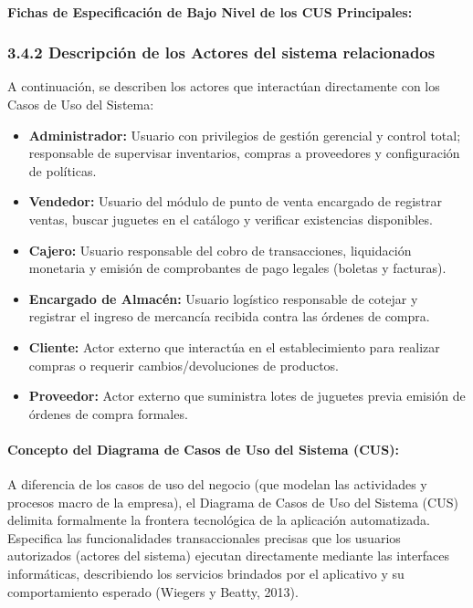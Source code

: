 \documentclass[12pt,a4paper]{article}
\begin{document}
\paragraph{Fichas de Especificación de Bajo Nivel de los CUS Principales:}



\subsubsection{3.4.2 Descripci\'on de los Actores del sistema relacionados}

A continuación, se describen los actores que interactúan directamente con los Casos de Uso del Sistema:

\begin{itemize}
    \item \textbf{Administrador:} Usuario con privilegios de gestión gerencial y control total; responsable de supervisar inventarios, compras a proveedores y configuración de políticas.
    \item \textbf{Vendedor:} Usuario del módulo de punto de venta encargado de registrar ventas, buscar juguetes en el catálogo y verificar existencias disponibles.
    \item \textbf{Cajero:} Usuario responsable del cobro de transacciones, liquidación monetaria y emisión de comprobantes de pago legales (boletas y facturas).
    \item \textbf{Encargado de Almacén:} Usuario logístico responsable de cotejar y registrar el ingreso de mercancía recibida contra las órdenes de compra.
    \item \textbf{Cliente:} Actor externo que interactúa en el establecimiento para realizar compras o requerir cambios/devoluciones de productos.
    \item \textbf{Proveedor:} Actor externo que suministra lotes de juguetes previa emisión de órdenes de compra formales.
\end{itemize}

\paragraph{Concepto del Diagrama de Casos de Uso del Sistema (CUS):}
A diferencia de los casos de uso del negocio (que modelan las actividades y procesos macro de la empresa), el Diagrama de Casos de Uso del Sistema (CUS) delimita formalmente la frontera tecnológica de la aplicación automatizada. Especifica las funcionalidades transaccionales precisas que los usuarios autorizados (actores del sistema) ejecutan directamente mediante las interfaces informáticas, describiendo los servicios brindados por el aplicativo y su comportamiento esperado (Wiegers y Beatty, 2013).
\end{document}
